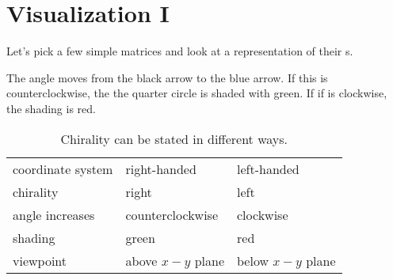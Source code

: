 \section{Visualization I}
Let's pick a few simple matrices and look at a representation of their \svdl s.

The angle moves from the black arrow to the blue arrow. If this is counterclockwise, the the quarter circle is shaded with green. If if is clockwise, the shading is red. 
\begin{table}[htdp]
\begin{center}
\begin{tabular}{lll}
 coordinate system & right-handed & left-handed \\
 chirality & right & left \\
 angle increases & counterclockwise & clockwise \\
 shading & green & red \\
 viewpoint & above $x-y$ plane & below $x-y$ plane
\end{tabular}
\end{center}
\caption[Chirality can be stated in different ways]{Chirality can be stated in different ways.}
\label{default}
\end{table}%


